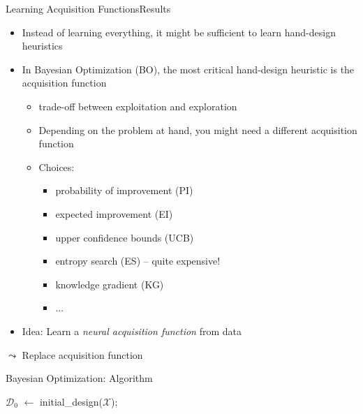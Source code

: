 \begin{frame}[c, fragile]{Learning Acquisition Functions\newline Results }

\begin{itemize}
	\item Instead of learning everything, it might be sufficient to \alert{learn hand-design heuristics}
	\item In Bayesian Optimization (BO), the most critical hand-design heuristic is the acquisition function
	\begin{itemize}
		\item trade-off between exploitation and exploration
		\item Depending on the problem at hand, you might need a different acquisition function
		\item Choices:
		\begin{itemize}
			\item probability of improvement (PI)
			\item expected improvement (EI)
			\item upper confidence bounds (UCB)
			\item entropy search (ES) -- quite expensive!
			\item knowledge gradient (KG)
			\item ...
		\end{itemize} 
	\end{itemize}
	\item \alert{Idea:} Learn a \emph{neural acquisition function} from data
\end{itemize}

$\leadsto$ Replace acquisition function 

\end{frame}
\begin{frame}[c,fragile]{Bayesian Optimization: Algorithm}

\begin{algorithm}[H]
	\BlankLine
	$\mathcal{D}_0$ $\leftarrow$ initial\_design($\mathcal{X}$); \\
	\caption{Bayesian Optimization (BO)}
\end{algorithm}


\end{frame}
